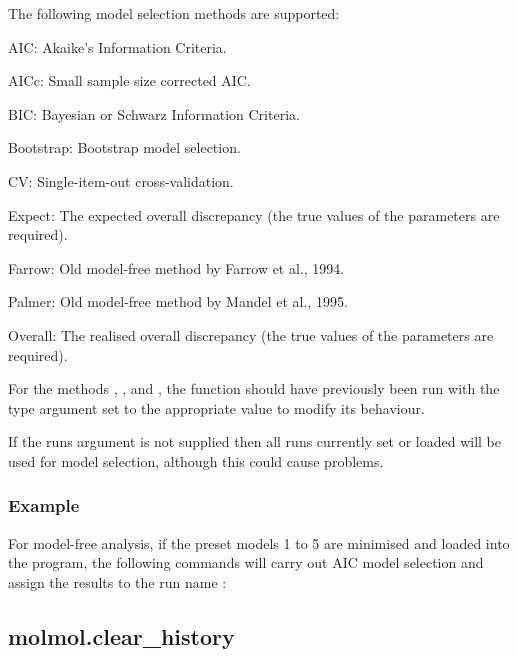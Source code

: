 The following model selection methods are supported:

AIC:  Akaike's Information Criteria.

AICc:  Small sample size corrected AIC.

BIC:  Bayesian or Schwarz Information Criteria.

Bootstrap:  Bootstrap model selection.

CV:  Single-item-out cross-validation.

Expect:  The expected overall discrepancy (the true values of the parameters are required).

Farrow:  Old model-free method by Farrow et al., 1994.

Palmer:  Old model-free method by Mandel et al., 1995.

Overall:  The realised overall discrepancy (the true values of the parameters are required).

For the methods 
, 
, and 
, the function 
 should have
previously been run with the type argument set to the appropriate value to modify its
behaviour.

If the runs argument is not supplied then all runs currently set or loaded will be used for
model selection, although this could cause problems.


\subsubsection{Example}

For model-free analysis, if the preset models 1 to 5 are minimised  and loaded into the
program, the following commands will carry out AIC model selection and assign the results
to the run name 
:







\newpage

\subsection{molmol.clear\_history}


